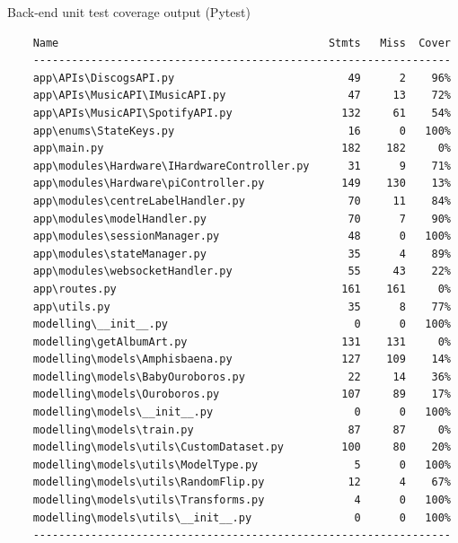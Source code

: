 \begin{uomappendix}
                \begin{table}
                    \centering
                    \caption{Back-end unit test coverage output (Pytest)}
                    \begin{verbatim}
    Name                                          Stmts   Miss  Cover
    -----------------------------------------------------------------
    app\APIs\DiscogsAPI.py                           49      2    96%
    app\APIs\MusicAPI\IMusicAPI.py                   47     13    72%
    app\APIs\MusicAPI\SpotifyAPI.py                 132     61    54%
    app\enums\StateKeys.py                           16      0   100%
    app\main.py                                     182    182     0%
    app\modules\Hardware\IHardwareController.py      31      9    71%
    app\modules\Hardware\piController.py            149    130    13% 
    app\modules\centreLabelHandler.py                70     11    84% 
    app\modules\modelHandler.py                      70      7    90%
    app\modules\sessionManager.py                    48      0   100%
    app\modules\stateManager.py                      35      4    89%
    app\modules\websocketHandler.py                  55     43    22%
    app\routes.py                                   161    161     0%
    app\utils.py                                     35      8    77%
    modelling\__init__.py                             0      0   100%
    modelling\getAlbumArt.py                        131    131     0%
    modelling\models\Amphisbaena.py                 127    109    14%
    modelling\models\BabyOuroboros.py                22     14    36%
    modelling\models\Ouroboros.py                   107     89    17%
    modelling\models\__init__.py                      0      0   100%
    modelling\models\train.py                        87     87     0%
    modelling\models\utils\CustomDataset.py         100     80    20%
    modelling\models\utils\ModelType.py               5      0   100%
    modelling\models\utils\RandomFlip.py             12      4    67%
    modelling\models\utils\Transforms.py              4      0   100%
    modelling\models\utils\__init__.py                0      0   100%
    -----------------------------------------------------------------
                    \end{verbatim}
                \end{table}
    

\end{uomappendix}
